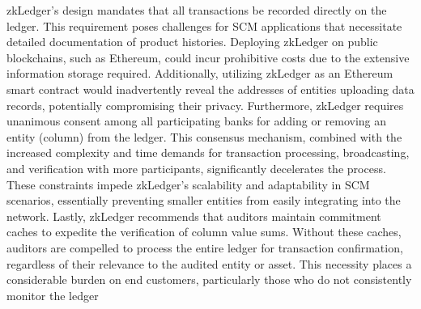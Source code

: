 zkLedger's design mandates that all transactions be recorded directly on the ledger. This requirement poses challenges for SCM applications that necessitate detailed documentation of product histories. Deploying zkLedger on public blockchains, such as Ethereum, could incur prohibitive costs due to the extensive information storage required. Additionally, utilizing zkLedger as an Ethereum smart contract would inadvertently reveal the addresses of entities uploading data records, potentially compromising their privacy. Furthermore, zkLedger requires unanimous consent among all participating banks for adding or removing an entity (column) from the ledger. This consensus mechanism, combined with the increased complexity and time demands for transaction processing, broadcasting, and verification with more participants, significantly decelerates the process. These constraints impede zkLedger's scalability and adaptability in SCM scenarios, essentially preventing smaller entities from easily integrating into the network. Lastly, zkLedger recommends that auditors maintain commitment caches to expedite the verification of column value sums. Without these caches, auditors are compelled to process the entire ledger for transaction confirmation, regardless of their relevance to the audited entity or asset. This necessity places a considerable burden on end customers, particularly those who do not consistently monitor the ledger







